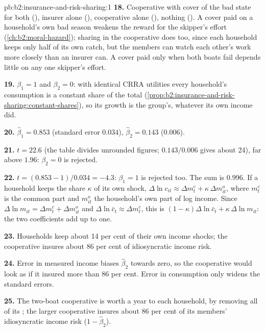 \begin{solution}{pb:b2:insurance-and-risk-sharing:1}
\textbf{18.} Cooperative with cover of the bad state for both (), insurer alone (),
cooperative alone (), nothing (). A cover paid on a household's own bad season
weakens the reward for the skipper's effort (\cref{ch:b2:moral-hazard}); sharing in the cooperative
does too, since each household keeps only half of its own catch, but the members can watch each
other's work more closely than an insurer can. A cover paid only when both boats fail depends little
on any one skipper's effort.

\textbf{19.} $\beta_1 = 1$ and $\beta_2 = 0$: with identical CRRA utilities every household's
consumption is a constant share of the total
(\cref{prop:b2:insurance-and-risk-sharing:constant-shares}), so its growth is the group's, whatever its
own income did.

\textbf{20.} $\hat\beta_1 = 0.853$ (standard error $0.034$), $\hat\beta_2 = 0.143$ ($0.006$).

\textbf{21.} $t = 22.6$ (the table divides unrounded figures; $0.143/0.006$ gives about 24), far
above $1.96$: $\beta_2 = 0$ is rejected.

\textbf{22.} $t = (0.853 - 1)/0.034 = -4.3$: $\beta_1 = 1$ is rejected too. The sum is $0.996$. If a
household keeps the share $\kappa$ of its own shock, $\Delta\ln c_{it} \approx \Delta m^{c}_t +
\kappa\,\Delta m^{o}_{it}$, where $m^{c}_t$ is the common part and $m^{o}_{it}$ the household's own
part of log income. Since $\Delta\ln m_{it} = \Delta m^{c}_t + \Delta m^{o}_{it}$ and
$\Delta\ln\bar c_t \approx \Delta m^{c}_t$, this is $(1 - \kappa)\Delta\ln\bar c_t + \kappa\,\Delta\ln m_{it}$: the two coefficients add up to
one.

\textbf{23.} Households keep about 14 per cent of their own income shocks; the cooperative insures about
86 per cent of idiosyncratic income risk.

\textbf{24.} Error in measured income biases $\hat\beta_2$ towards zero, so the cooperative would look
as if it insured more than 86 per cent. Error in consumption only widens the standard errors.

\textbf{25.} The two-boat cooperative is worth  a year to each household, by removing all of
its ; the larger cooperative insures about 86 per cent of its members' idiosyncratic
income risk ($1 - \hat\beta_2$).
\end{solution}
